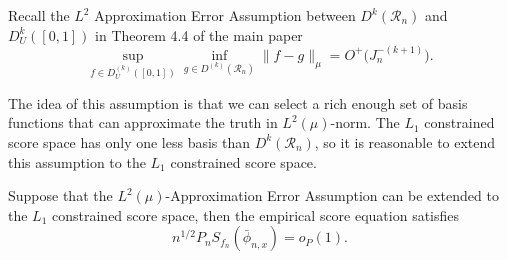 Recall the $L^2$ Approximation Error Assumption between $D^k(\mathcal{R}_n)$ and $D^k_U([0,1])$ in Theorem 4.4 of the main paper 
\[
\sup_{f\in D^{(k)}_U([0,1])}\inf_{g\in D^{(k)}(\mathcal R_{n})}\|f-g\|_{\mu}
=O^+\bigl(J_{n}^{-(k+1)}\bigr).
\]

The idea of this assumption is that we can select a rich enough set of basis functions that can approximate the truth in $L^2(\mu)$-norm. The $L_1$ constrained score space has only one less basis than $D^k(\mathcal{R}_n)$, so it is reasonable to extend this assumption to the $L_1$ constrained score space. 

\begin{theorem} \label{thm:score-approximation-negligibility-hal-mle}
Suppose that the $L^2(\mu)$-Approximation Error Assumption can be extended to the $L_1$ constrained score space, then the empirical score equation satisfies
\[
n^{1/2}P_n S_{f_n}(\bar{\phi}_{n,x}) = o_P(1).
\]
\end{theorem}

